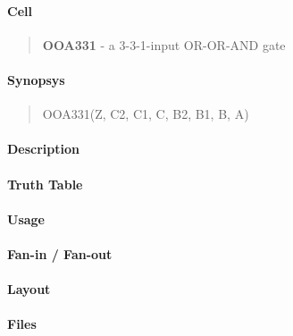 \label{OOA331}
\paragraph{Cell}
\begin{quote}
    \textbf{OOA331} - a 3-3-1-input OR-OR-AND gate
\end{quote}

\paragraph{Synopsys}
\begin{quote}
    OOA331(Z, C2, C1, C, B2, B1, B, A)
\end{quote}

\paragraph{Description}

%

\paragraph{Truth Table}
%

\paragraph{Usage}

\paragraph{Fan-in / Fan-out}

\paragraph{Layout}

\paragraph{Files}
